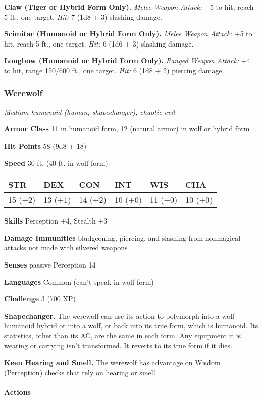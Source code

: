 \documentclass[
]{article}
\begin{document}
\textbf{Claw (Tiger or Hybrid Form Only).} \emph{Melee Weapon Attack:}
+5 to hit, reach 5 ft., one target. \emph{Hit:} 7 (1d8 + 3) slashing
damage.

\textbf{Scimitar (Humanoid or Hybrid Form Only).} \emph{Melee Weapon
Attack:} +5 to hit, reach 5 ft., one target. \emph{Hit:} 6 (1d6 + 3)
slashing damage.

\textbf{Longbow (Humanoid or Hybrid Form Only).} \emph{Ranged Weapon
Attack:} +4 to hit, range 150/600 ft., one target. \emph{Hit:} 6 (1d8 +
2) piercing damage.

\hypertarget{werewolf}{%
\subsubsection{Werewolf}\label{werewolf}}

\emph{Medium humanoid (human, shapechanger), chaotic evil}

\textbf{Armor Class} 11 in humanoid form, 12 (natural armor) in wolf or
hybrid form

\textbf{Hit Points} 58 (9d8 + 18)

\textbf{Speed} 30 ft. (40 ft. in wolf form)

\begin{longtable}[]{@{}llllll@{}}
\toprule
STR & DEX & CON & INT & WIS & CHA\tabularnewline
\midrule
\endhead
15 (+2) & 13 (+1) & 14 (+2) & 10 (+0) & 11 (+0) & 10 (+0)\tabularnewline
\bottomrule
\end{longtable}

\textbf{Skills} Perception +4, Stealth +3

\textbf{Damage Immunities} bludgeoning, piercing, and slashing from
nonmagical attacks not made with silvered weapons

\textbf{Senses} passive Perception 14

\textbf{Languages} Common (can't speak in wolf form)

\textbf{Challenge} 3 (700 XP)

\textbf{Shapechanger.} The werewolf can use its action to polymorph into
a wolf-­‐humanoid hybrid or into a wolf, or back into its true form,
which is humanoid. Its statistics, other than its AC, are the same in
each form. Any equipment it is wearing or carrying isn't transformed. It
reverts to its true form if it dies.

\textbf{Keen Hearing and Smell.} The werewolf has advantage on Wisdom
(Perception) checks that rely on hearing or smell.

\hypertarget{actions-7}{%
\paragraph{Actions}\label{actions-7}}
\end{document}
